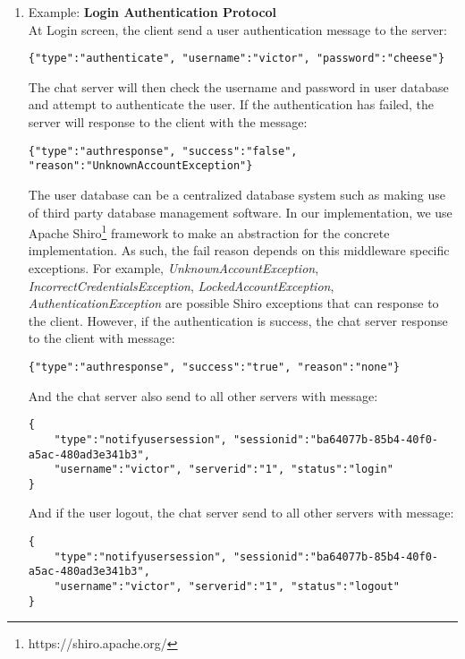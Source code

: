 \documentclass[dareport.tex]{subfiles}
\begin{document}
\begin{enumerate}[leftmargin=*]
\item Example: \textbf{Login Authentication Protocol}
\\
At Login screen, the client send a user authentication message to the server:
\begin{small}
\begin{verbatim}
{"type":"authenticate", "username":"victor", "password":"cheese"}
\end{verbatim}
\end{small}
The chat server will then check the username and password in user database and attempt to authenticate the user. If the authentication has failed, the server will response to the client with the message:
\begin{small}
\begin{verbatim}
{"type":"authresponse", "success":"false", "reason":"UnknownAccountException"}
\end{verbatim}
\end{small}
The user database can be a centralized database system such as making use of third party database management software. In our implementation, we use Apache Shiro\footnote{https://shiro.apache.org/} framework to make an abstraction for the concrete implementation. As such, the fail reason depends on this middleware specific exceptions. For example, \textit{UnknownAccountException}, \textit{IncorrectCredentialsException}, \textit{LockedAccountException}, \textit{AuthenticationException} are possible Shiro exceptions that can response to the client.
However, if the authentication is success, the chat server response to the client with message:
\begin{small}
\begin{verbatim}
{"type":"authresponse", "success":"true", "reason":"none"}
\end{verbatim}
\end{small}
And the chat server also send to all other servers with message:
\begin{small}
\begin{verbatim}
{
    "type":"notifyusersession", "sessionid":"ba64077b-85b4-40f0-a5ac-480ad3e341b3", 
    "username":"victor", "serverid":"1", "status":"login"
}
\end{verbatim}
\end{small}
And if the user logout, the chat server send to all other servers with message:
\begin{small}
\begin{verbatim}
{
    "type":"notifyusersession", "sessionid":"ba64077b-85b4-40f0-a5ac-480ad3e341b3",
    "username":"victor", "serverid":"1", "status":"logout"
}
\end{verbatim}
\end{small}




\end{enumerate}
\end{document}
